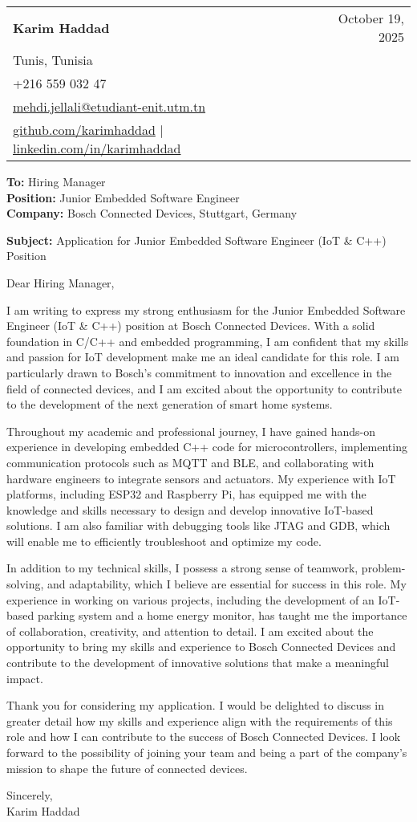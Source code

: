 \documentclass[letterpaper,11pt]{article}
\makeatletter
\newcommand{\letterHeading}[5]{
    \begin{tabular*}{\textwidth}{l@{\extracolsep{\fill}}r}
    \textbf{\Large #1} & #5 \\  %
    #2 & \\
    #3 & \\
    #4 & \\
    \end{tabular*}
    \vspace{15pt}
}
\newcommand{\letterRecipient}[3]{
    \textbf{\large To:} #1 \\
    \textbf{\large Position:} #2 \\
    \textbf{\large Company:} #3 \\
    \vspace{12pt}
}
\newcommand{\letterSubject}[1]{
    \textbf{\large Subject:} #1 \\
    \vspace{15pt}
}
\makeatother
\begin{document}
    \letterHeading
    {Karim Haddad}
    {Tunis, Tunisia}
    {+216 559 032 47 \\ \href{mailto:mehdi.jellali@etudiant-enit.utm.tn}{mehdi.jellali@etudiant-enit.utm.tn}}
    {\href{https://github.com/karimhaddad}{github.com/karimhaddad} $|$ \href{https://www.linkedin.com/in/karimhaddad}{linkedin.com/in/karimhaddad}}
    {October 19, 2025}

    \letterRecipient
    {Hiring Manager}
    {Junior Embedded Software Engineer}
    {Bosch Connected Devices, Stuttgart, Germany}

    \letterSubject{Application for Junior Embedded Software Engineer (IoT & C++) Position}

    Dear Hiring Manager,

    I am writing to express my strong enthusiasm for the Junior Embedded Software Engineer (IoT & C++) position at Bosch Connected Devices. With a solid foundation in C/C++ and embedded programming, I am confident that my skills and passion for IoT development make me an ideal candidate for this role. I am particularly drawn to Bosch's commitment to innovation and excellence in the field of connected devices, and I am excited about the opportunity to contribute to the development of the next generation of smart home systems.

    Throughout my academic and professional journey, I have gained hands-on experience in developing embedded C++ code for microcontrollers, implementing communication protocols such as MQTT and BLE, and collaborating with hardware engineers to integrate sensors and actuators. My experience with IoT platforms, including ESP32 and Raspberry Pi, has equipped me with the knowledge and skills necessary to design and develop innovative IoT-based solutions. I am also familiar with debugging tools like JTAG and GDB, which will enable me to efficiently troubleshoot and optimize my code.

    In addition to my technical skills, I possess a strong sense of teamwork, problem-solving, and adaptability, which I believe are essential for success in this role. My experience in working on various projects, including the development of an IoT-based parking system and a home energy monitor, has taught me the importance of collaboration, creativity, and attention to detail. I am excited about the opportunity to bring my skills and experience to Bosch Connected Devices and contribute to the development of innovative solutions that make a meaningful impact.

    Thank you for considering my application. I would be delighted to discuss in greater detail how my skills and experience align with the requirements of this role and how I can contribute to the success of Bosch Connected Devices. I look forward to the possibility of joining your team and being a part of the company's mission to shape the future of connected devices.

    Sincerely,\\[12pt]

    Karim Haddad
\end{document}

